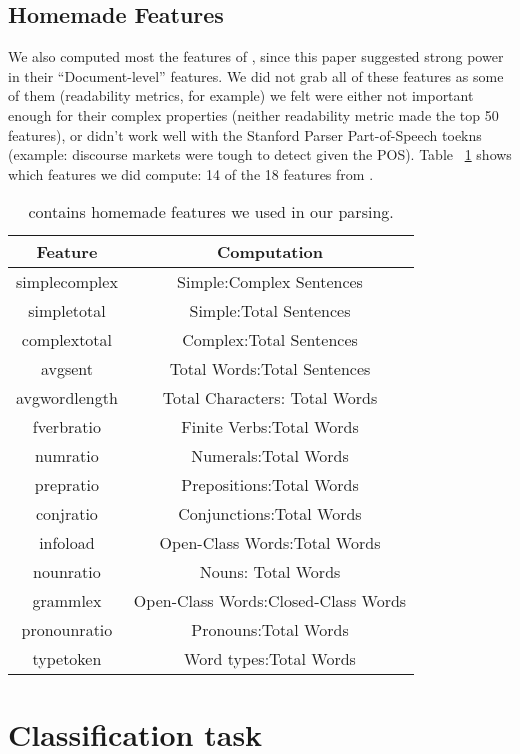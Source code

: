 \documentclass[10pt]{article}
\begin{document}
\subsection{Homemade Features}
We also computed most the features of \cite{homemade}, since this paper suggested strong power in their ``Document-level'' features. We did not grab all of these features as some of them (readability metrics, for example) we felt were either not important enough for their complex properties (neither readability metric made the top 50 features), or didn't work well with the Stanford Parser Part-of-Speech toekns (example: discourse markets were tough to detect given the POS). Table ~\ref{HMTable} shows which features we did compute: 14 of the 18 features from \cite{homemade}.


\begin{table}[h!]
\begin{center}
\label{HMTable}
\begin{tabular}{|c|c|}
\hline
Feature & Computation \\\hline
simplecomplex & Simple:Complex Sentences \\
simpletotal & Simple:Total Sentences \\
complextotal & Complex:Total Sentences \\
avgsent & Total Words:Total Sentences \\
avgwordlength & Total Characters: Total Words \\
fverbratio & Finite Verbs:Total Words\\
numratio & Numerals:Total Words \\ 
prepratio & Prepositions:Total Words \\ 
conjratio & Conjunctions:Total Words \\
infoload & Open-Class Words:Total Words \\
nounratio & Nouns: Total Words \\
grammlex & Open-Class Words:Closed-Class Words \\
pronounratio & Pronouns:Total Words \\
typetoken & Word types:Total Words \\\hline
\end{tabular}
\caption{ contains homemade features we used in our parsing. }
\end{center}
\end{table}




\section{Classification task}
\end{document}
